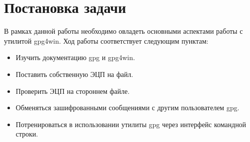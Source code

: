 \section{Постановка задачи}

В рамках данной работы необходимо овладеть основными аспектами работы с утилитой gpg4win. Ход работы соответствует следующим пунктам:
\begin{itemize}
    \item Изучить документацию gpg и gpg4win.
    \item Поставить собственную ЭЦП на файл.
    \item Проверить ЭЦП на стороннем файле.
    \item Обменяться зашифрованными сообщениями с другим пользователем gpg.
    \item Потренироваться в использовании утилиты gpg через интерфейс командной строки.
\end{itemize}